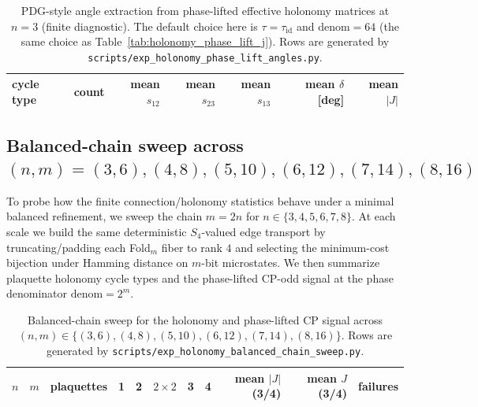 \begin{table}[t]
\centering
\small
\setlength{\tabcolsep}{10pt}
\renewcommand{\arraystretch}{1.15}
\begin{tabular}{lrrrrrr}
\toprule
cycle type & count & mean $s_{12}$ & mean $s_{23}$ & mean $s_{13}$ & mean $\delta$ [deg] & mean $|J|$ \\
\midrule
%
\end{tabular}
\caption{PDG-style angle extraction from phase-lifted effective holonomy matrices at $n=3$ (finite diagnostic). The default choice here is $\tau=\tau_{\mathrm{id}}$ and $\mathrm{denom}=64$ (the same choice as Table~\ref{tab:holonomy_phase_lift_j}). Rows are generated by \texttt{scripts/exp\_holonomy\_phase\_lift\_angles.py}.}
\label{tab:holonomy_phase_lift_angles}
\end{table}

\subsection{Balanced-chain sweep across \texorpdfstring{$(n,m)=(3,6),(4,8),(5,10),(6,12),(7,14),(8,16)$}{(n,m)=(3,6),(4,8),(5,10),(6,12),(7,14),(8,16)}}
\label{subsec:holonomy_balanced_chain_sweep}

To probe how the finite connection/holonomy statistics behave under a minimal balanced refinement, we sweep the chain $m=2n$ for $n\in\{3,4,5,6,7,8\}$.
At each scale we build the same deterministic $S_4$-valued edge transport by truncating/padding each Fold$_m$ fiber to rank $4$ and selecting the minimum-cost bijection under Hamming distance on $m$-bit microstates.
We then summarize plaquette holonomy cycle types and the phase-lifted CP-odd signal at the phase denominator $\mathrm{denom}=2^m$.

\begin{table}[t]
\centering
\scriptsize
\setlength{\tabcolsep}{4pt}
\renewcommand{\arraystretch}{1.15}
\begin{tabular}{rrrrrrrrrrr}
\toprule
$n$ & $m$ & plaquettes &
1 & 2 & $2\times 2$ & 3 & 4 &
mean $|J|$ (3/4) & mean $J$ (3/4) & failures \\
\midrule
%
\end{tabular}
\caption{Balanced-chain sweep for the holonomy and phase-lifted CP signal across $(n,m)\in\{(3,6),(4,8),(5,10),(6,12),(7,14),(8,16)\}$. Rows are generated by \texttt{scripts/exp\_holonomy\_balanced\_chain\_sweep.py}.}
\label{tab:holonomy_balanced_chain_sweep}
\end{table}

